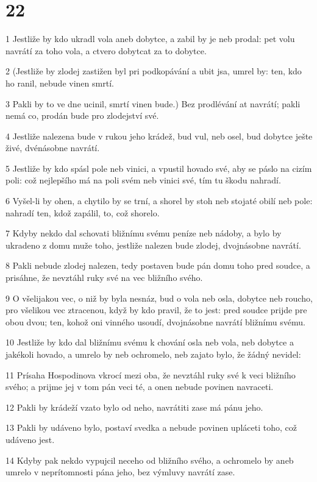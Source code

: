 \chapter{22}

\par 1 Jestliže by kdo ukradl vola aneb dobytce, a zabil by je neb prodal: pet volu navrátí za toho vola, a ctvero dobytcat za to dobytce.
\par 2 (Jestliže by zlodej zastižen byl pri podkopávání a ubit jsa, umrel by: ten, kdo ho ranil, nebude vinen smrtí.
\par 3 Pakli by to ve dne ucinil, smrtí vinen bude.) Bez prodlévání at navrátí; pakli nemá co, prodán bude pro zlodejství své.
\par 4 Jestliže nalezena bude v rukou jeho krádež, bud vul, neb osel, bud dobytce ješte živé, dvénásobne navrátí.
\par 5 Jestliže by kdo spásl pole neb vinici, a vpustil hovado své, aby se páslo na cizím poli: což nejlepšího má na poli svém neb vinici své, tím tu škodu nahradí.
\par 6 Vyšel-li by ohen, a chytilo by se trní, a shorel by stoh neb stojaté obilí neb pole: nahradí ten, kdož zapálil, to, což shorelo.
\par 7 Kdyby nekdo dal schovati bližnímu svému peníze neb nádoby, a bylo by ukradeno z domu muže toho, jestliže nalezen bude zlodej, dvojnásobne navrátí.
\par 8 Pakli nebude zlodej nalezen, tedy postaven bude pán domu toho pred soudce, a prisáhne, že nevztáhl ruky své na vec bližního svého.
\par 9 O všelijakou vec, o niž by byla nesnáz, bud o vola neb osla, dobytce neb roucho, pro všelikou vec ztracenou, když by kdo pravil, že to jest: pred soudce prijde pre obou dvou; ten, kohož oni vinného usoudí, dvojnásobne navrátí bližnímu svému.
\par 10 Jestliže by kdo dal bližnímu svému k chování osla neb vola, neb dobytce a jakékoli hovado, a umrelo by neb ochromelo, neb zajato bylo, že žádný nevidel:
\par 11 Prísaha Hospodinova vkrocí mezi oba, že nevztáhl ruky své k veci bližního svého; a prijme jej v tom pán veci té, a onen nebude povinen navraceti.
\par 12 Pakli by krádeží vzato bylo od neho, navrátiti zase má pánu jeho.
\par 13 Pakli by udáveno bylo, postaví svedka a nebude povinen upláceti toho, což udáveno jest.
\par 14 Kdyby pak nekdo vypujcil neceho od bližního svého, a ochromelo by aneb umrelo v neprítomnosti pána jeho, bez výmluvy navrátí zase.
